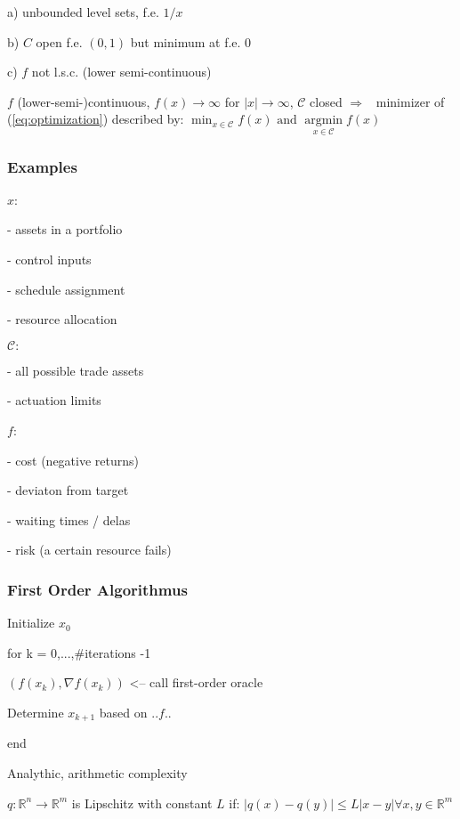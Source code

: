 a) unbounded level sets, f.e. $1/x$

b) $C$ open f.e. $(0,1)$ but minimum at f.e. $0$

c) $f$ not l.s.c. (lower semi-continuous)

%
\begin{proposition}
	$f$ (lower-semi-)continuous,
	$f(x)\rightarrow\infty$ for $|x|\rightarrow\infty$,
	$\mathcal{C}$ closed
	$\Rightarrow$ \exists\ minimizer of (\ref{eq:optimization}) described by:
	$
		\min_{x \in \mathcal{C}} f(x) \text{\ and\ } \underset{x \in \mathcal{C}}{\operatorname{argmin}} f(x) %
	$
\end{proposition}


\subsubsection{Examples}

$x$:

- assets in a portfolio

- control inputs

- schedule assignment

- resource allocation

$\mathcal{C}:$

- all possible trade assets

- actuation limits

$f$:

- cost (negative returns)

- deviaton from target

- waiting times / delas

- risk (a certain resource fails)

\subsubsection{First Order Algorithmus}

Initialize $x_0$

for k = 0,...,\#iterations -1

$(f(x_k),\nabla f(x_k))$ <-- call first-order oracle

Determine $x_{k+1}$ based on ${..f..}$

end

Analythic, arithmetic complexity

\begin{definition}
	$q: \mathbb{R}^{n} \rightarrow \mathbb{R}^{m}$
	is Lipschitz with constant $L$ if:
	$|q(x)-q(y)| \le L |x-y| \forall x,y \in \mathbb{R}^{m}$
\end{definition}

